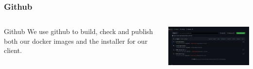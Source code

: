 \documentclass[aspectratio=169]{beamer}
\begin{document}
\begin{frame}
    \frametitle{Github}

    \begin{columns}
        \begin{column}{0.28\textwidth}
            \begin{block}{Github}
                We use github to build, check and publish both our docker images and the installer for our client.
            \end{block}
        \end{column}
        \begin{column}{0.58\textwidth}
            \includegraphics[width=9cm]{github.png}
        \end{column}
    \end{columns}

\end{frame}
\end{document}
